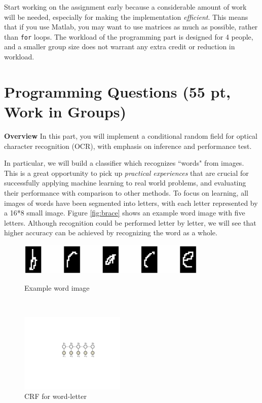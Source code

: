 \documentclass[11pt]{report}
\begin{document}
Start working on the assignment early
because a considerable amount of work will be needed,
especially for making the implementation \emph{efficient}.
This means that if you use Matlab, you may want to use matrices as much as possible,
rather than \verb#for# loops.
%
The workload of the programming part is designed for 4 people, and a smaller group size  does not warrant any extra credit or reduction in workload.


\vspace{3em}

\section*{Programming Questions (55 pt, Work in Groups)}


{\bf \large Overview}	
In this part, you will implement a conditional random field for optical character recognition (OCR),
with emphasis on inference and performance test.






In particular, we will build a classifier which recognizes ``words" from images.
This is a great opportunity to pick up \emph{practical experiences} that are crucial for successfully applying machine learning to real world problems,
and evaluating their performance with comparison to other methods.
To focus on learning, all images of words have been segmented into letters,
with each letter represented by a 16*8 small image.
Figure \ref{fig:brace} shows an example word image with five letters.
Although recognition could be performed letter by letter,
we will see that higher accuracy can be achieved by recognizing the word as a whole.


\begin{figure}[t!]
	\begin{minipage}[b]{0.62\textwidth}
		\centering
		\vspace{-0.6em}
		\includegraphics[width=9cm]{brace.jpg}
		\vspace{0.6em}
		\caption{Example word image}\label{fig:brace}
	\end{minipage}
	~~~
	\begin{minipage}[b]{0.33\textwidth}
		\centering
		\includegraphics[width=5cm]{crf}
		\caption{CRF for word-letter}\label{fig:CRF_model}
	\end{minipage}
\end{figure}
\end{document}

